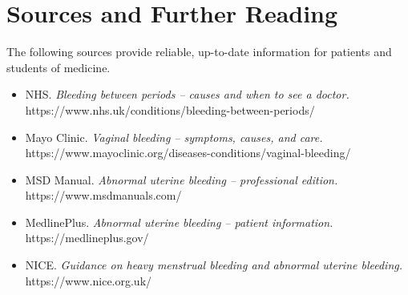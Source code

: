 \section*{Sources and Further Reading}
The following sources provide reliable, up-to-date information for patients and students of medicine.

\begin{itemize}
    \item NHS. \textit{Bleeding between periods -- causes and when to see a doctor.} https://www.nhs.uk/conditions/bleeding-between-periods/
    \item Mayo Clinic. \textit{Vaginal bleeding -- symptoms, causes, and care.} https://www.mayoclinic.org/diseases-conditions/vaginal-bleeding/
    \item MSD Manual. \textit{Abnormal uterine bleeding -- professional edition.} https://www.msdmanuals.com/
    \item MedlinePlus. \textit{Abnormal uterine bleeding -- patient information.} https://medlineplus.gov/
    \item NICE. \textit{Guidance on heavy menstrual bleeding and abnormal uterine bleeding.} https://www.nice.org.uk/
\end{itemize}
